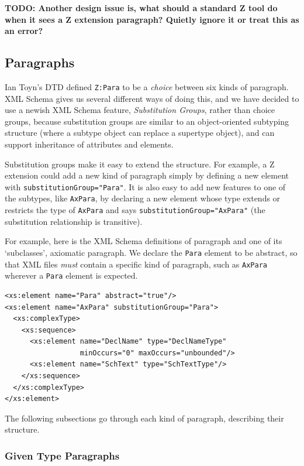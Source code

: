 \documentclass{llncs}  %
\newcommand{\TODO}[1]{\textbf{TODO: #1}}   %
\begin{document}
\TODO{ Another design issue is, what should a standard Z tool do when it
  sees a Z extension paragraph?  Quietly ignore it or treat this as an
  error?  } 


\subsection{Paragraphs}

Ian Toyn's DTD defined \verb!Z:Para! to be a \emph{choice} between six
kinds of paragraph.  XML Schema gives us several different ways of doing
this, and we have decided to use a newish XML Schema feature,
\emph{Substitution Groups}, rather than choice groups, because substitution
groups are similar to an object-oriented subtyping structure (where a
subtype object can replace a supertype object), and can support inheritance
of attributes and elements.   

Substitution groups make it easy to extend the structure.  For example, a Z
extension could add a new kind of paragraph simply by defining a new
element with \texttt{substitutionGroup="Para"}.  It is also easy to add new
features to one of the subtypes, like \texttt{AxPara}, by declaring a new
element whose type extends or restricts the type of \texttt{AxPara} and
says \texttt{substitutionGroup="AxPara"} (the substitution relationship is
transitive).

For example, here is the XML Schema definitions of paragraph and one of its
`subclasses', axiomatic paragraph.  We declare the \texttt{Para} element to
be abstract, so that XML files \emph{must} contain a specific kind of
paragraph, such as \texttt{AxPara} wherever a \texttt{Para} element is
expected.
\begin{verbatim}
<xs:element name="Para" abstract="true"/>
<xs:element name="AxPara" substitutionGroup="Para">
  <xs:complexType>
    <xs:sequence>
      <xs:element name="DeclName" type="DeclNameType" 
                  minOccurs="0" maxOccurs="unbounded"/>
      <xs:element name="SchText" type="SchTextType"/>
    </xs:sequence>
  </xs:complexType>
</xs:element>
\end{verbatim}

The following subsections go
through each kind of paragraph, describing their structure.


\subsubsection{Given Type Paragraphs}\label{giventypes}
\end{document}
